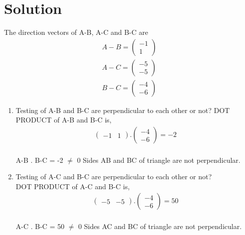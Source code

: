 \documentclass[journal,12pt,twocolumn]{IEEEtran}
\newcommand{\myvec}[1]{\ensuremath{\begin{pmatrix}#1\end{pmatrix}}}
\begin{document}
\section{Solution}
The direction vectors of A-B, A-C and B-C are
\begin{align}
	A-B=\myvec{-1 \\ 1} \\
	A-C=\myvec{-5 \\ -5}\\
	B-C=\myvec{-4 \\ -6} 
\end{align}
\begin{enumerate}
\item Testing of  A-B and B-C are perpendicular to each other or not?
DOT PRODUCT of  A-B and B-C is, \begin{align} \myvec{ -1 & 1 } . \myvec{ -4 \\ -6 } = -2\end{align}\\
A-B . B-C = -2 $\neq$ 0
Sides AB and BC of triangle are not perpendicular.


\item Testing of  A-C and B-C are perpendicular to each other or not?\\
DOT PRODUCT of  A-C and B-C is, \begin{align} \myvec{ -5 & -5 } . \myvec{ -4 \\ -6 } = 50\end{align}\\
A-C . B-C = 50 $\neq$ 0 
Sides AC and BC of triangle are not perpendicular.



\end{enumerate}
\end{document}
